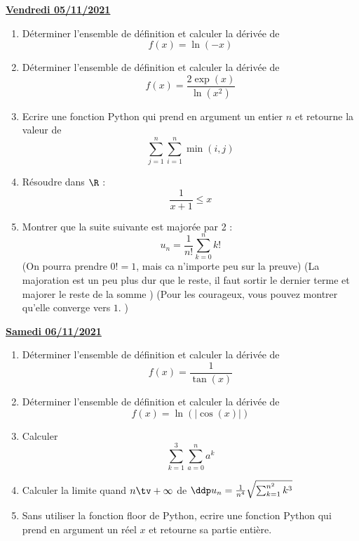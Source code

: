 \documentclass[a4paper, 11pt,reqno]{article}
\newcommand{\jour}[1]{
\begin{center}
\underline{\textbf{#1}}
\end{center}

 }
\begin{document}
\jour{Vendredi 05/11/2021}
\begin{exercice}
\begin{enumerate}
\item  Déterminer l'ensemble de définition et calculer la dérivée de
$$f(x)=\ln(-x)$$
\item  Déterminer l'ensemble de définition et calculer la dérivée de
$$f(x)= \frac{2\exp(x)}{\ln(x^2)}$$

\item Ecrire une fonction Python qui prend en argument un entier $n$ et retourne la valeur de 
$$\sum_{j=1}^n\sum_{i=1}^n \min(i,j)$$
\item Résoudre dans $\R$ : 
$$\frac{1}{x+1}\leq x$$
\item Montrer que la suite suivante est majorée par 2 : 
$$u_n = \frac{1}{n!} \sum_{k=0}^n k!$$
(On pourra prendre $0! =1$, mais ca n'importe peu sur la preuve) 
(La majoration est un peu plus dur que le reste, il faut sortir le dernier terme et majorer le reste de la  somme ) 
(Pour les courageux, vous pouvez montrer qu'elle converge vers $1$. )
\end{enumerate}
\end{exercice}

\jour{Samedi  06/11/2021}
\begin{exercice}
\begin{enumerate}
\item  Déterminer l'ensemble de définition et calculer la dérivée de
$$f(x) =\frac{1}{\tan(x)}$$
\item  Déterminer l'ensemble de définition et calculer la dérivée de
$$f(x) =\ln(|\cos(x)|)$$
\item  Calculer 
$$\sum_{k=1}^{3}\sum_{a=0}^n a^k$$
\item Calculer la limite quand $n\tv+\infty$ de $\ddp u_n=\frac{1}{n^4}\sqrt{\sum_{k=1}^{n^2}k^3 }$
\item Sans utiliser la fonction floor de Python, ecrire une fonction Python qui prend en argument un réel $x$ et retourne sa partie entière. 
\end{enumerate}
\end{exercice}
\end{document}

